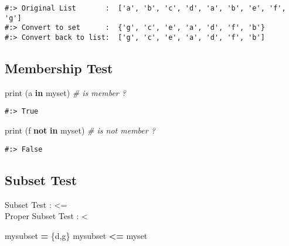 \documentclass[
]{book}
\newenvironment{Shaded}{\begin{snugshade}}{\end{snugshade}}
\newcommand{\BuiltInTok}[1]{#1}
\newcommand{\CommentTok}[1]{\textcolor[rgb]{0.37,0.37,0.37}{\textit{#1}}}
\newcommand{\KeywordTok}[1]{\textcolor[rgb]{0.27,0.27,0.27}{\textbf{#1}}}
\newcommand{\NormalTok}[1]{#1}
\newcommand{\OperatorTok}[1]{\textcolor[rgb]{0.43,0.43,0.43}{\textbf{#1}}}
\newcommand{\StringTok}[1]{\textcolor[rgb]{0.5,0.5,0.5}{#1}}
\begin{document}
\begin{verbatim}
#:> Original List       :  ['a', 'b', 'c', 'd', 'a', 'b', 'e', 'f', 'g'] 
#:> Convert to set      :  {'g', 'c', 'e', 'a', 'd', 'f', 'b'} 
#:> Convert back to list:  ['g', 'c', 'e', 'a', 'd', 'f', 'b']
\end{verbatim}

\hypertarget{membership-test}{%
\subsection{Membership Test}\label{membership-test}}

\begin{Shaded}
\begin{Highlighting}[]
\BuiltInTok{print}\NormalTok{ (}\StringTok{\textquotesingle{}a\textquotesingle{}} \KeywordTok{in}\NormalTok{ myset)      }\CommentTok{\# is member ?}
\end{Highlighting}
\end{Shaded}

\begin{verbatim}
#:> True
\end{verbatim}

\begin{Shaded}
\begin{Highlighting}[]
\BuiltInTok{print}\NormalTok{ (}\StringTok{\textquotesingle{}f\textquotesingle{}} \KeywordTok{not} \KeywordTok{in}\NormalTok{ myset)  }\CommentTok{\# is not member ?}
\end{Highlighting}
\end{Shaded}

\begin{verbatim}
#:> False
\end{verbatim}

\hypertarget{subset-test}{%
\subsection{Subset Test}\label{subset-test}}

Subset Test : \textless=\\
Proper Subset Test : \textless{}

\begin{Shaded}
\begin{Highlighting}[]
\NormalTok{mysubset }\OperatorTok{=}\NormalTok{ \{}\StringTok{\textquotesingle{}d\textquotesingle{}}\NormalTok{,}\StringTok{\textquotesingle{}g\textquotesingle{}}\NormalTok{\}}
\NormalTok{mysubset }\OperatorTok{\textless{}=}\NormalTok{ myset}
\end{Highlighting}
\end{Shaded}
\end{document}
